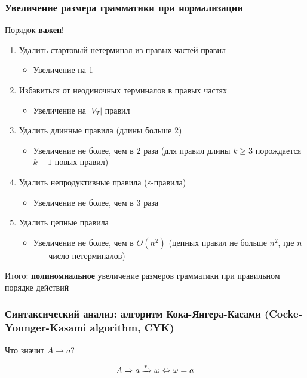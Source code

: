 \documentclass{beamer}
\newcommand{\derives}[1][*]{\xRightarrow[]{#1}}
\begin{document}
\begin{frame}[fragile]
  \transwipe[direction=90]
  \frametitle{Увеличение размера грамматики при нормализации}

\begin{center}
    Порядок \textbf{важен}!
\end{center}

  \begin{enumerate}
    \item Удалить стартовый нетерминал из правых частей правил
    \begin{itemize}
      \item Увеличение на 1
    \end{itemize}
    \item Избавиться от неодиночных терминалов в правых частях
    \begin{itemize}
      \item Увеличение на $|V_T|$ правил
    \end{itemize}
    \item Удалить длинные правила (длины больше 2)
    \begin{itemize}
      \item Увеличение не более, чем в 2 раза (для правил длины $k \geq 3$ порождается $k-1$ новых правил)
    \end{itemize}
    \item Удалить непродуктивные правила ($\varepsilon$-правила)
    \begin{itemize}
      \item Увеличение не более, чем в 3 раза
    \end{itemize}
    \item Удалить цепные правила
    \begin{itemize}
      \item Увеличение не более, чем в $O(n^2)$ (цепных правил не больше $n^2$, где $n$~--- число нетерминалов)
    \end{itemize}
  \end{enumerate}

  Итого: \textbf{полиномиальное} увеличение размеров грамматики при правильном порядке действий
\end{frame}

\begin{frame}[fragile]
  \transwipe[direction=90]
  \frametitle{Синтаксический анализ: алгоритм Кока-Янгера-Касами (Cocke-Younger-Kasami algorithm, CYK)}

  \begin{center}
    Что значит $A \to a$?
  \end{center} \pause

 \[ A \derives[]  a  \derives \omega \Leftrightarrow \omega = a \]
\end{frame}
\end{document}
